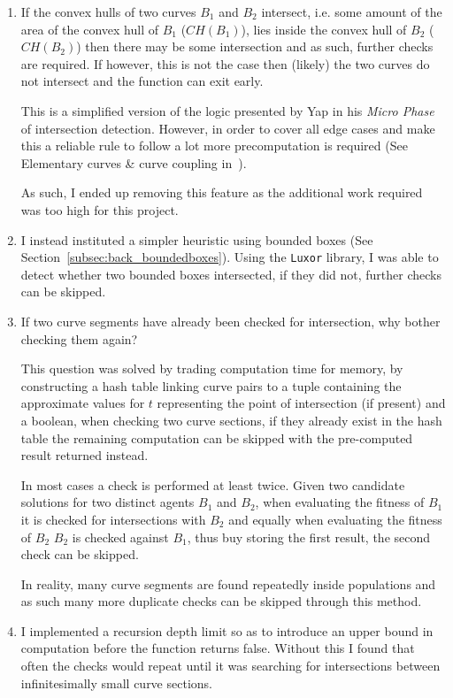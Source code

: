 \begin{enumerate}
  \item If the convex hulls of two curves $B_{1}$ and $B_{2}$ intersect, i.e. some amount of the area of the convex hull of $B_{1}$ ($CH(B_{1})$), lies inside the convex hull of $B_{2}$ ($CH(B_{2})$) then there may  be some intersection and as such, further checks are required. If however, this is not the case then (likely) the two curves do not intersect and the function can exit early.

        This is a simplified version of the logic presented by Yap in his \textit{Micro Phase} of intersection detection. However, in order to cover all edge cases and make this a reliable rule to follow a lot more precomputation is required (See Elementary curves \& curve coupling in~\cite{yapCompleteSubdivisionAlgorithms2006}).

        As such, I ended up removing this feature as the additional work required was too high for this project.
    \item I instead instituted a simpler heuristic using bounded boxes (See Section~\ref{subsec:back_boundedboxes}). Using the \texttt{Luxor} library\cite{JuliaGraphicsLuxorJl2021}, I was able to detect whether two bounded boxes intersected, if they did not, further checks can be skipped.
  \item If two curve segments have already been checked for intersection, why bother checking them again?

        This question was solved by trading computation time for memory, by constructing a hash table linking curve pairs to a tuple containing the approximate values for $t$ representing the point of intersection (if present) and a boolean, when checking two curve sections, if they already exist in the hash table the remaining computation can be skipped with the pre-computed result returned instead.

        In most cases a check is performed at least twice. Given two candidate solutions for two distinct agents $B_{1}$ and $B_{2}$, when evaluating the fitness of $B_{1}$ it is checked for intersections with $B_{2}$ and equally when evaluating the fitness of $B_{2}$ $B_{2}$ is checked against $B_{1}$, thus buy storing the first result, the second check can be skipped.

        In reality, many curve segments are found repeatedly inside populations and as such many more duplicate checks can be skipped through this method.
  \item I implemented a recursion depth limit so as to introduce an upper bound in computation before the function returns false. Without this I found that often the checks would repeat until it was searching for intersections between infinitesimally small curve sections.


\end{enumerate}
